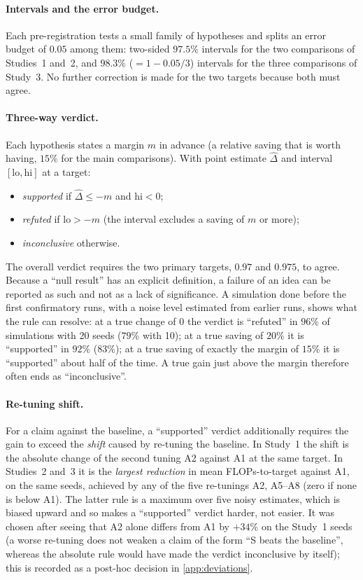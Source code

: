 \paragraph{Intervals and the error budget.} Each pre-registration tests a small family of hypotheses and splits an error budget of $0.05$ among them: two-sided $97.5\%$ intervals for the two comparisons of Studies~1 and~2, and $98.3\%$ ($=1-0.05/3$) intervals for the three comparisons of Study~3. No further correction is made for the two targets because both must agree.

\paragraph{Three-way verdict.} Each hypothesis states a margin $m$ in advance (a relative saving that is worth having, $15\%$ for the main comparisons). With point estimate $\hat\Delta$ and interval $[\mathrm{lo},\mathrm{hi}]$ at a target:
\begin{itemize}
\item \emph{supported} if $\hat\Delta\le -m$ and $\mathrm{hi}<0$;
\item \emph{refuted} if $\mathrm{lo}>-m$ (the interval excludes a saving of $m$ or more);
\item \emph{inconclusive} otherwise.
\end{itemize}
The overall verdict requires the two primary targets, $0.97$ and $0.975$, to agree. Because a ``null result'' has an explicit definition, a failure of an idea can be reported as such and not as a lack of significance. A simulation done before the first confirmatory runs, with a noise level estimated from earlier runs, shows what the rule can resolve: at a true change of $0$ the verdict is ``refuted'' in $96\%$ of simulations with 20 seeds ($79\%$ with 10); at a true saving of $20\%$ it is ``supported'' in $92\%$ ($83\%$); at a true saving of exactly the margin of $15\%$ it is ``supported'' about half of the time. A true gain just above the margin therefore often ends as ``inconclusive''.

\paragraph{Re-tuning shift.} For a claim against the baseline, a ``supported'' verdict additionally requires the gain to exceed the \emph{shift} caused by re-tuning the baseline. In Study~1 the shift is the absolute change of the second tuning A2 against A1 at the same target. In Studies~2 and~3 it is the \emph{largest reduction} in mean FLOPs-to-target against A1, on the same seeds, achieved by any of the five re-tunings A2, A5--A8 (zero if none is below A1). The latter rule is a maximum over five noisy estimates, which is biased upward and so makes a ``supported'' verdict harder, not easier. It was chosen after seeing that A2 alone differs from A1 by $+34\%$ on the Study~1 seeds (a worse re-tuning does not weaken a claim of the form ``S beats the baseline'', whereas the absolute rule would have made the verdict inconclusive by itself); this is recorded as a post-hoc decision in \cref{app:deviations}.

